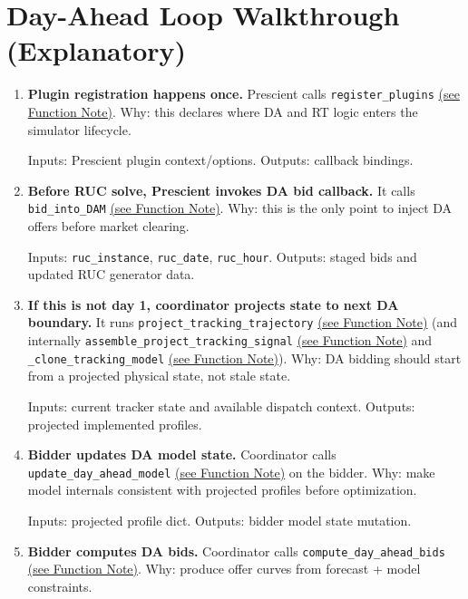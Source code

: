 \documentclass{article}
\begin{document}
\section{Day-Ahead Loop Walkthrough (Explanatory)}
\begin{enumerate}[leftmargin=*]
  \item \textbf{Plugin registration happens once.} Prescient calls \texttt{register\_plugins} \hyperref[fn:register_plugins]{(see Function Note)}. Why: this declares where DA and RT logic enters the simulator lifecycle.

  Inputs: Prescient plugin context/options. Outputs: callback bindings.

  \item \textbf{Before RUC solve, Prescient invokes DA bid callback.} It calls \texttt{bid\_into\_DAM} \hyperref[fn:bid_into_DAM]{(see Function Note)}. Why: this is the only point to inject DA offers before market clearing.

  Inputs: \texttt{ruc\_instance}, \texttt{ruc\_date}, \texttt{ruc\_hour}. Outputs: staged bids and updated RUC generator data.

  \item \textbf{If this is not day 1, coordinator projects state to next DA boundary.} It runs \texttt{project\_tracking\_trajectory} \hyperref[fn:project_tracking_trajectory]{(see Function Note)} (and internally \texttt{assemble\_project\_tracking\_signal} \hyperref[fn:assemble_project_tracking_signal]{(see Function Note)} and \texttt{\_clone\_tracking\_model} \hyperref[fn:clone_tracking_model]{(see Function Note)}). Why: DA bidding should start from a projected physical state, not stale state.

  Inputs: current tracker state and available dispatch context. Outputs: projected implemented profiles.

  \item \textbf{Bidder updates DA model state.} Coordinator calls \texttt{update\_day\_ahead\_model} \hyperref[fn:update_day_ahead_model]{(see Function Note)} on the bidder. Why: make model internals consistent with projected profiles before optimization.

  Inputs: projected profile dict. Outputs: bidder model state mutation.

  \item \textbf{Bidder computes DA bids.} Coordinator calls \texttt{compute\_day\_ahead\_bids} \hyperref[fn:compute_day_ahead_bids]{(see Function Note)}. Why: produce offer curves from forecast + model constraints.


\end{enumerate}
\end{document}
